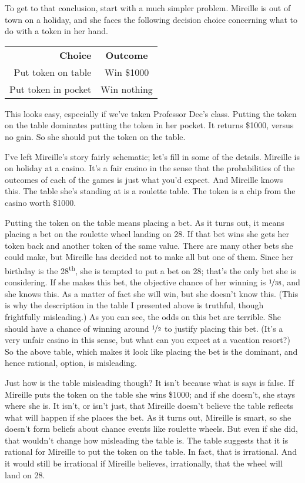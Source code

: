 \documentclass[11pt,]{book}
\def\toprule{}
\def\bottomrule{}
\begin{document}
To get to that conclusion, start with a much simpler problem. Mireille is out of town on a holiday, and she faces the following decision choice concerning what to do with a token in her hand.

\begin{longtable}[]{@{}rc@{}}
\toprule
\endhead
\textbf{Choice} & \textbf{Outcome}\tabularnewline
Put token on table & Win \$1000\tabularnewline
Put token in pocket & Win nothing\tabularnewline
\bottomrule
\end{longtable}

This looks easy, especially if we've taken Professor Dec's class. Putting the token on the table dominates putting the token in her pocket. It returns \$1000, versus no gain. So she should put the token on the table.

I've left Mireille's story fairly schematic; let's fill in some of the details. Mireille is on holiday at a casino. It's a fair casino in the sense that the probabilities of the outcomes of each of the games is just what you'd expect. And Mireille knows this. The table she's standing at is a roulette table. The token is a chip from the casino worth \$1000.

Putting the token on the table means placing a bet. As it turns out, it means placing a bet on the roulette wheel landing on 28. If that bet wins she gets her token back and another token of the same value. There are many other bets she could make, but Mireille has decided not to make all but one of them. Since her birthday is the 28\textsuperscript{th}, she is tempted to put a bet on 28; that's the only bet she is considering. If she makes this bet, the objective chance of her winning is \(\nicefrac{1}{38}\), and she knows this. As a matter of fact she will win, but she doesn't know this. (This is why the description in the table I presented above is truthful, though frightfully misleading.) As you can see, the odds on this bet are terrible. She should have a chance of winning around \(\nicefrac{1}{2}\) to justify placing this bet. (It's a very unfair casino in this sense, but what can you expect at a vacation resort?) So the above table, which makes it look like placing the bet is the dominant, and hence rational, option, is misleading.

Just how is the table misleading though? It isn't because what is says is false. If Mireille puts the token on the table she wins \$1000; and if she doesn't, she stays where she is. It isn't, or isn't just, that Mireille doesn't believe the table reflects what will happen if she places the bet. As it turns out, Mireille is smart, so she doesn't form beliefs about chance events like roulette wheels. But even if she did, that wouldn't change how misleading the table is. The table suggests that it is rational for Mireille to put the token on the table. In fact, that is irrational. And it would still be irrational if Mireille believes, irrationally, that the wheel will land on 28.
\end{document}
